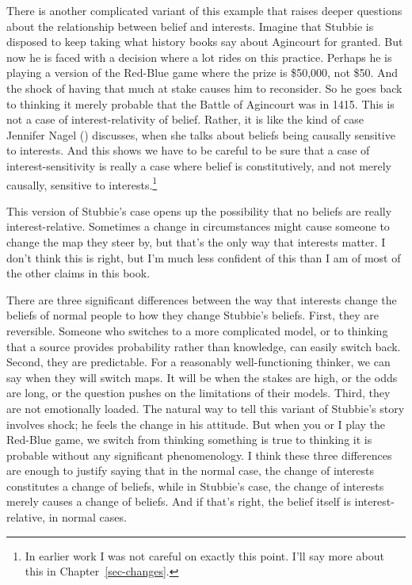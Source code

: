\documentclass[
  12pt,
  letterpaper,
]{scrbook}
\begin{document}
There is another complicated variant of this example that raises deeper
questions about the relationship between belief and interests. Imagine
that Stubbie is disposed to keep taking what history books say about
Agincourt for granted. But now he is faced with a decision where a lot
rides on this practice. Perhaps he is playing a version of the Red-Blue
game where the prize is \$50,000, not \$50. And the shock of having that
much at stake causes him to reconsider. So he goes back to thinking it
merely probable that the Battle of Agincourt was in 1415. This is not a
case of interest-relativity of belief. Rather, it is like the kind of
case Jennifer Nagel () discusses, when she
talks about beliefs being causally sensitive to interests. And this
shows we have to be careful to be sure that a case of
interest-sensitivity is really a case where belief is constitutively,
and not merely causally, sensitive to interests.\footnote{In earlier
  work I was not careful on exactly this point. I'll say more about this
  in Chapter~\ref{sec-changes}.}

This version of Stubbie's case opens up the possibility that no beliefs
are really interest-relative. Sometimes a change in circumstances might
cause someone to change the map they steer by, but that's the only way
that interests matter. I don't think this is right, but I'm much less
confident of this than I am of most of the other claims in this book.

There are three significant differences between the way that interests
change the beliefs of normal people to how they change Stubbie's
beliefs. First, they are reversible. Someone who switches to a more
complicated model, or to thinking that a source provides probability
rather than knowledge, can easily switch back. Second, they are
predictable. For a reasonably well-functioning thinker, we can say when
they will switch maps. It will be when the stakes are high, or the odds
are long, or the question pushes on the limitations of their models.
Third, they are not emotionally loaded. The natural way to tell this
variant of Stubbie's story involves shock; he feels the change in his
attitude. But when you or I play the Red-Blue game, we switch from
thinking something is true to thinking it is probable without any
significant phenomenology. I think these three differences are enough to
justify saying that in the normal case, the change of interests
constitutes a change of beliefs, while in Stubbie's case, the change of
interests merely causes a change of beliefs. And if that's right, the
belief itself is interest-relative, in normal cases.
\end{document}
